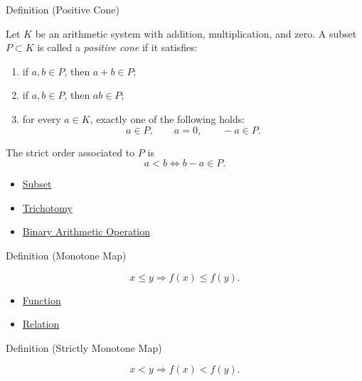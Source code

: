 \begin{definitionbox}{Definition (Positive Cone)}
\begin{definition}
\label{def:positive-cone}
Let $K$ be an arithmetic system with addition, multiplication, and zero. A
subset $P\subset K$ is called a \emph{positive cone} if it satisfies:
\begin{enumerate}
  \item if $a,b\in P$, then $a+b\in P$;
  \item if $a,b\in P$, then $ab\in P$;
  \item for every $a\in K$, exactly one of the following holds:
  \[
  a\in P,
  \qquad
  a=0,
  \qquad
  -a\in P.
  \]
\end{enumerate}
The strict order associated to $P$ is
\[
a<b \iff b-a\in P.
\]
\end{definition}
\end{definitionbox}

\begin{dependencies}
\begin{itemize}
  \item \hyperref[def:subset]{Subset}
  \item \hyperref[def:trichotomy]{Trichotomy}
  \item \hyperref[def:binary-arithmetic-operation]{Binary Arithmetic Operation}
\end{itemize}
\end{dependencies}

\begin{definitionbox}{Definition (Monotone Map)}
\begin{definition}
\label{def:monotone-map}
\[
x\le y \Longrightarrow f(x)\le f(y).
\]
\end{definition}
\end{definitionbox}

\begin{dependencies}
\begin{itemize}
  \item \hyperref[def:function]{Function}
  \item \hyperref[def:relation]{Relation}
\end{itemize}
\end{dependencies}

\begin{definitionbox}{Definition (Strictly Monotone Map)}
\begin{definition}
\label{def:strictly-monotone-map}
\[
x<y \Longrightarrow f(x)<f(y).
\]
\end{definition}
\end{definitionbox}

